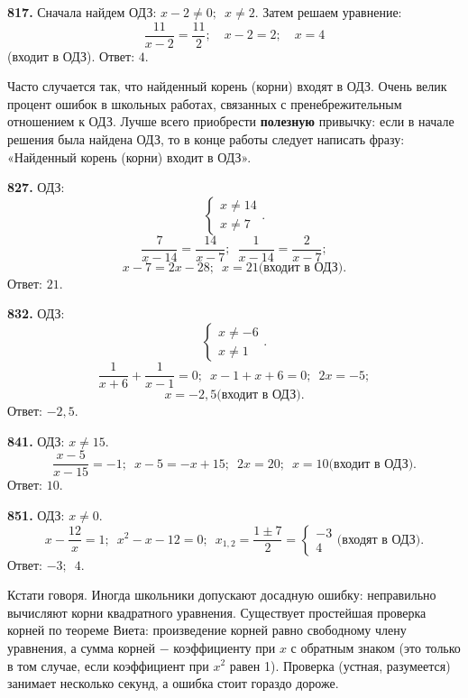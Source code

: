 \textbf{817.}  Сначала найдем ОДЗ: $x-2\ne0;\enspace x\ne2$. Затем  решаем уравнение: $$\frac{11}{x-2}=\frac{11}{2};\quad x-2=2;\quad x=4$$ (входит в ОДЗ). \newline \null \hspace*{\fill} Ответ: $4$.

Часто случается так, что найденный корень (корни) входят в ОДЗ. Очень велик процент ошибок в школьных работах,  связанных  с пренебрежительным отношением к ОДЗ. Лучше всего приобрести \textbf{полезную} привычку: если в начале решения была найдена ОДЗ, то в конце работы следует написать фразу: «Найденный корень (корни) входит в ОДЗ».  

\textbf{827.} ОДЗ: $$\begin{cases} x\ne 14 \\ x\ne 7\end{cases}.$$$$\frac{7}{x-14}=\frac{14}{x-7};\enspace \frac{1}{x-14}=\frac{2}{x-7};$$$$ x-7=2x-28;\enspace x=21\text{(входит в ОДЗ).}$$ \newline \null \hspace*{\fill} Ответ: $21$.

\textbf{832.} ОДЗ: $$\begin{cases} x\ne -6 \\ x\ne 1\end{cases}.$$ $$\frac{1}{x+6}+\frac{1}{x-1}=0;\enspace x-1+x+6=0;\enspace 2x=-5;$$$$ x=-2,5\text{(входит в ОДЗ)}.$$
\newline \null \hspace*{\fill} Ответ: $-2,5$.

\newpage\textbf{841.} ОДЗ: $x\ne15$. $$\frac{x-5}{x-15}=-1;\enspace x-5=-x+15;\enspace 2x=20;\enspace x=10\text{(входит в ОДЗ)}.$$ \newline \null \hspace*{\fill} Ответ: $10$.

\textbf{851.} ОДЗ: $x\ne0$.$$x-\frac{12}{x}=1;\enspace x^2-x-12=0;\enspace x_{1,2}=\frac{1\pm7}{2}=\begin{cases} -3 \\ 4 \end{cases}\text{(входят в ОДЗ)}.$$ \newline \null \hspace*{\fill} Ответ: $-3;\enspace 4$.

Кстати говоря. Иногда школьники допускают досадную ошибку: неправильно вычисляют корни квадратного уравнения. Существует простейшая проверка корней по теореме Виета: произведение корней равно свободному члену уравнения, а сумма корней $-$ коэффициенту при $x$ с обратным знаком (это только в том случае, если коэффициент при $x^2$  равен 1). Проверка (устная, разумеется) занимает несколько секунд, а ошибка стоит гораздо дороже. 

